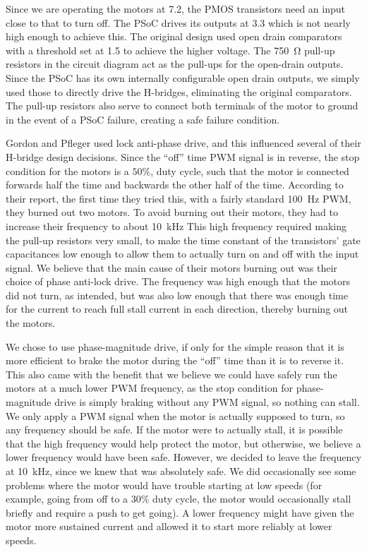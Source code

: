 \documentclass[letterpaper, 11pt]{article}
\begin{document}
\begin{enumerate}[label=\textbf{\arabic*.}]
Since we are operating the motors at \SI{7.2}{\volts}, the PMOS transistors need an input close to that to turn off. The PSoC drives its outputs at \SI{3.3}{\volts} which is not nearly high enough to achieve this. The original design used open drain comparators with a threshold set at \SI{1.5}{\volts} to achieve the higher voltage. The \SI{750}{\ohm} pull-up resistors in the circuit diagram act as the pull-ups for the open-drain outputs. Since the PSoC has its own internally configurable open drain outputs, we simply used those to directly drive the H-bridges, eliminating the original comparators. The pull-up resistors also serve to connect both terminals of the motor to ground in the event of a PSoC failure, creating a safe failure condition.

Gordon and Pfleger used lock anti-phase drive, and this influenced several of their H-bridge design decisions. Since the ``off'' time PWM signal is in reverse, the stop condition for the motors is a $50\%$, duty cycle, such that the motor is connected forwards half the time and backwards the other half of the time. According to their report, the first time they tried this, with a fairly standard \SI{100}{\hertz} PWM, they burned out two motors. To avoid burning out their motors, they had to increase their frequency to about \SI{10}{\kilo\hertz} This high frequency required making the pull-up resistors very small, to make the time constant of the transistors' gate capacitances low enough to allow them to actually turn on and off with the input signal. We believe that the main cause of their motors burning out was their choice of phase anti-lock drive. The frequency was high enough that the motors did not turn, as intended, but was also low enough that there was enough time for the current to reach full stall current in each direction, thereby burning out the motors.

We chose to use phase-magnitude drive, if only for the simple reason that it is more efficient to brake the motor during the ``off'' time than it is to reverse it. This also came with the benefit that we believe we could have safely run the motors at a much lower PWM frequency, as the stop condition for phase-magnitude drive is simply braking without any PWM signal, so nothing can stall. We only apply a PWM signal when the motor is actually supposed to turn, so any frequency should be safe. If the motor were to actually stall, it is possible that the high frequency would help protect the motor, but otherwise, we believe a lower frequency would have been safe. However, we decided to leave the frequency at \SI{10}{\kilo\hertz}, since we knew that was absolutely safe. We did occasionally see some problems where the motor would have trouble starting at low speeds (for example, going from off to a $30\%$ duty cycle, the motor would occasionally stall briefly and require a push to get going). A lower frequency might have given the motor more sustained current and allowed it to start more reliably at lower speeds.


\end{enumerate}
\end{document}
